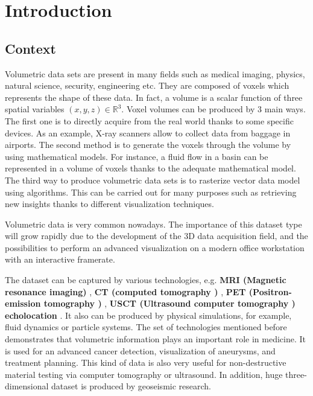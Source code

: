 
\chapter{Introduction} %

\label{Introduction} %


\newcommand{\keyword}[1]{\textbf{#1}}
\newcommand{\tabhead}[1]{\textbf{#1}}
\newcommand{\code}[1]{\texttt{#1}}
\newcommand{\file}[1]{\texttt{\bfseries#1}}
\newcommand{\option}[1]{\texttt{\itshape#1}}



\section{Context}

Volumetric data sets are present in many fields such as medical imaging, physics, natural science, security, engineering etc. They are composed of voxels which represents the shape of these data. In fact, a volume is a scalar function of three spatial variables $(x,y,z) \in \mathbb{R}^3$. Voxel volumes can be produced by 3 main ways. The first one is to directly acquire from the real world thanks to some specific devices. As an example, X-ray scanners allow to collect data from baggage in airports. The second method is to generate the voxels through the volume by using mathematical models. For instance, a fluid flow in a basin can be represented in a volume of voxels thanks to the adequate mathematical model. The third way to produce volumetric data sets is to  rasterize vector data model using algorithms. This can be carried out for many purposes such as retrieving new insights thanks to different visualization techniques.

Volumetric data is very common nowadays. The importance of this dataset type will grow rapidly due to the development of the 3D data acquisition field, and the possibilities to perform an advanced visualization on a modern office workstation with an interactive framerate.

The dataset can be captured by various technologies, e.g. \textbf{  MRI (Magnetic resonance imaging) } , \textbf{ CT (computed tomography ) }, \textbf{PET (Positron-emission tomography ) }, \textbf{ USCT (Ultrasound computer tomography ) echolocation }. It also can be produced by physical simulations, for example, fluid dynamics or particle systems. The set of technologies mentioned before demonstrates that volumetric information plays an important role in medicine. It is used for an advanced cancer detection, visualization of aneurysms, and treatment planning. This kind of data is also very useful for non-destructive material testing via computer tomography or ultrasound. In addition, huge three-dimensional dataset is produced by geoseismic research.


